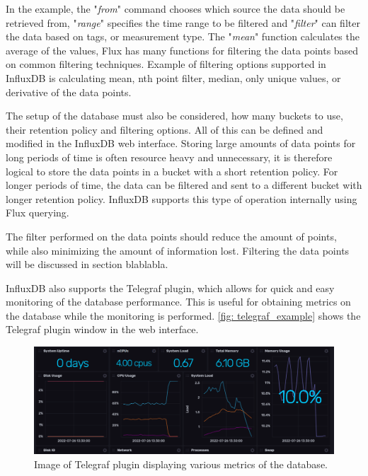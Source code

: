 \documentclass[main.tex]{subfiles}
\begin{document}
In the example, the "\textit{from}" command chooses which source the data should be retrieved from, "\textit{range}" specifies the time range to be filtered and "\textit{filter}" can filter the data based on tags, or measurement type. The "\textit{mean}" function calculates the average of the values, Flux has many functions for filtering the data points based on common filtering techniques. Example of filtering options supported in InfluxDB is calculating mean, nth point filter, median, only unique values, or derivative of the data points.


The setup of the database must also be considered, how many buckets to use, their retention policy and filtering options. All of this can be defined and modified in the InfluxDB web interface. Storing large amounts of data points for long periods of time is often resource heavy and unnecessary, it is therefore logical to store the data points in a bucket with a short retention policy. For longer periods of time, the data can be filtered and sent to a different bucket with longer retention policy. InfluxDB supports this type of operation internally using Flux querying. 

The filter performed on the data points should reduce the amount of points, while also minimizing the amount of information lost. Filtering the data points will be discussed in section blablabla.

InfluxDB also supports the Telegraf plugin, which allows for quick and easy monitoring of the database performance. This is useful for obtaining metrics on the database while the monitoring is performed. \autoref{fig: telegraf_example} shows the Telegraf plugin window in the web interface.

\begin{figure}[!htpb]
    \centering
    \includegraphics[width=17cm, scale=4]{images/telegraf_example.png}
    \caption{Image of Telegraf plugin displaying various metrics of the database.}
    \label{fig: telegraf_example}
\end{figure}
\FloatBarrier
\end{document}
